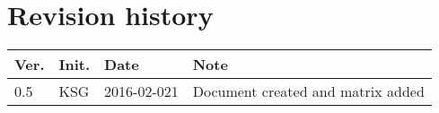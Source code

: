 \chapter*{Revision history}
\label{app:rev_his}


\begin{tabular}{b{1cm} b{1cm} b{2cm} b{8cm}}
    \textbf{Ver.} & \textbf{Init.} & \textbf{Date} & \textbf{Note} \\
    \hline
    0.5 & KSG & 2016-02-021 & Document created and matrix added \\
\end{tabular}
